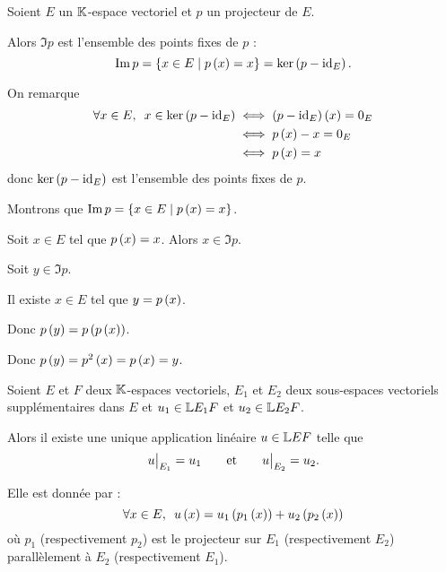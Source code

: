 \begin{prop}
Soient \(E\) un \(\mathbb{K}\)-espace vectoriel et \(p\) un projecteur de \(E\).

Alors \(\Im p\) est l'ensemble des points fixes de \(p\) : \[\operatorname{Im} p=\left\lbrace x\in E\;\middle|\; p\left(x\right)=x\right\rbrace=\ker\left(p-\mathrm{id}_{E}\right).\]
\end{prop}

\begin{dem}
On remarque \[\begin{aligned}
\quantifs{\forall x\in E}x\in\ker\paren{p-\id{E}}&\ssi\paren{p-\id{E}}\paren{x}=0_E \\
&\ssi p\paren{x}-x=0_E \\
&\ssi p\paren{x}=x
\end{aligned}\] donc \(\ker\left(p-\mathrm{id}_{E}\right)\) est l'ensemble des points fixes de \(p\).

Montrons que \(\operatorname{Im} p=\left\lbrace x\in E\;\middle|\; p\left(x\right)=x\right\rbrace\).

\increc Soit \(x\in E\) tel que \(p\left(x\right)=x\). Alors \(x\in\Im p\).

\incdir

Soit \(y\in\Im p\).

Il existe \(x\in E\) tel que \(y=p\left(x\right)\).

Donc \(p\left(y\right)=p\left(p\left(x\right)\right)\).

Donc \(p\left(y\right)=p^2\left(x\right)=p\left(x\right)=y\).
\end{dem}

\begin{prop}
Soient \(E\) et \(F\) deux \(\mathbb{K}\)-espaces vectoriels, \(E_1\) et \(E_2\) deux sous-espaces vectoriels supplémentaires dans \(E\) et \(u_1\in\mathbb{L}{E_1}{F}\) et \(u_2\in\mathbb{L}{E_2}{F}\).

Alors il existe une unique application linéaire \(u\in\mathbb{L}{E}{F}\) telle que \[\restr{u}{E_1}=u_1\qquad\text{et}\qquad\restr{u}{E_2}=u_2.\]

Elle est donnée par : \[\quantifs{\forall x\in E}u\paren{x}=u_1\paren{p_1\paren{x}}+u_2\paren{p_2\paren{x}}\] où \(p_1\) (respectivement \(p_2\)) est le projecteur sur \(E_1\) (respectivement \(E_2\)) parallèlement à \(E_2\) (respectivement \(E_1\)).
\end{prop}

